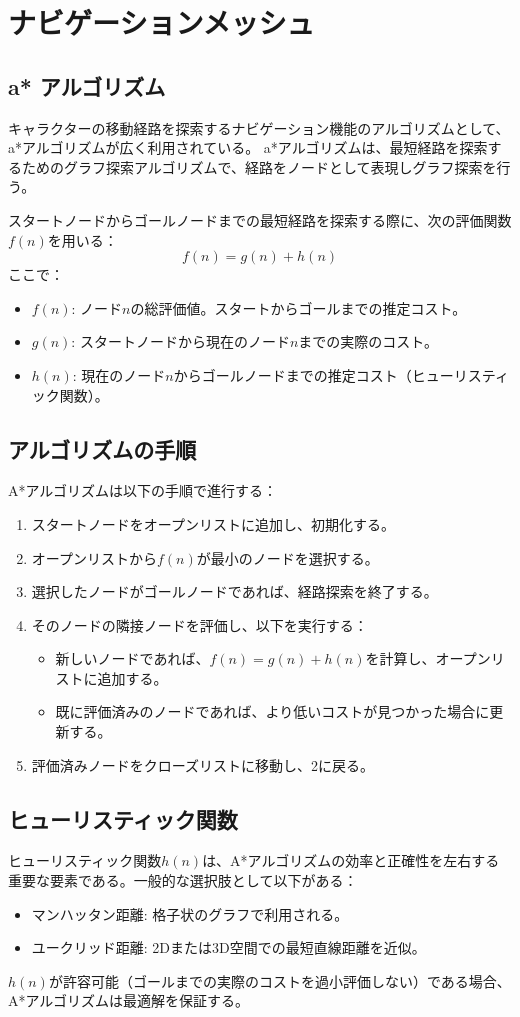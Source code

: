 \section{ナビゲーションメッシュ}
\subsection{a* アルゴリズム}
キャラクターの移動経路を探索するナビゲーション機能のアルゴリズムとして、a*アルゴリズムが広く利用されている。
a*アルゴリズムは、最短経路を探索するためのグラフ探索アルゴリズムで、経路をノードとして表現しグラフ探索を行う。

スタートノードからゴールノードまでの最短経路を探索する際に、次の評価関数$f(n)$を用いる：
\[
f(n) = g(n) + h(n)
\]
ここで：
\begin{itemize}
    \item $f(n)$: ノード$n$の総評価値。スタートからゴールまでの推定コスト。
    \item $g(n)$: スタートノードから現在のノード$n$までの実際のコスト。
    \item $h(n)$: 現在のノード$n$からゴールノードまでの推定コスト（ヒューリスティック関数）。
\end{itemize}

\subsection*{アルゴリズムの手順}
A*アルゴリズムは以下の手順で進行する：
\begin{enumerate}
    \item スタートノードをオープンリストに追加し、初期化する。
    \item オープンリストから$f(n)$が最小のノードを選択する。
    \item 選択したノードがゴールノードであれば、経路探索を終了する。
    \item そのノードの隣接ノードを評価し、以下を実行する：
    \begin{itemize}
        \item 新しいノードであれば、$f(n) = g(n) + h(n)$を計算し、オープンリストに追加する。
        \item 既に評価済みのノードであれば、より低いコストが見つかった場合に更新する。
    \end{itemize}
    \item 評価済みノードをクローズリストに移動し、2に戻る。
\end{enumerate}

\subsection*{ヒューリスティック関数}
ヒューリスティック関数$h(n)$は、A*アルゴリズムの効率と正確性を左右する重要な要素である。一般的な選択肢として以下がある：
\begin{itemize}
    \item マンハッタン距離: 格子状のグラフで利用される。
    \item ユークリッド距離: 2Dまたは3D空間での最短直線距離を近似。
\end{itemize}
$h(n)$が許容可能（ゴールまでの実際のコストを過小評価しない）である場合、A*アルゴリズムは最適解を保証する。

